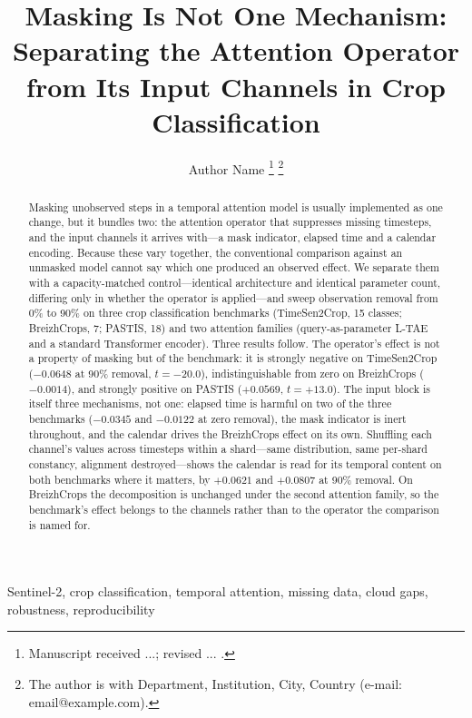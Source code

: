 \documentclass[journal]{IEEEtran}
\begin{document}
\title{Masking Is Not One Mechanism: Separating the Attention Operator from
Its Input Channels in Crop Classification}

\author{Author Name%
\thanks{Manuscript received ...; revised ... .}%
\thanks{The author is with Department, Institution, City, Country (e-mail:
email@example.com).}}

\maketitle

\begin{abstract}
Masking unobserved steps in a temporal attention model is usually implemented as
one change, but it bundles two: the attention operator that suppresses missing
timesteps, and the input channels it arrives with---a mask indicator, elapsed
time and a calendar encoding. Because these vary together, the conventional
comparison against an unmasked model cannot say which one produced an observed
effect. We separate them with a capacity-matched control---identical
architecture and identical parameter count, differing only in whether the
operator is applied---and sweep observation removal from 0\% to 90\% on three
crop classification benchmarks (TimeSen2Crop, 15 classes; BreizhCrops, 7;
PASTIS, 18) and two attention families (query-as-parameter L-TAE and a standard
Transformer encoder). Three results follow. The operator's effect is not a
property of masking but of the benchmark: it is strongly negative on
TimeSen2Crop ($-0.0648$ at 90\% removal, $t=-20.0$), indistinguishable from zero
on BreizhCrops ($-0.0014$), and strongly positive on PASTIS ($+0.0569$,
$t=+13.0$). The input block is itself three mechanisms, not one: elapsed time is
harmful on two of the three benchmarks ($-0.0345$ and $-0.0122$ at zero
removal), the mask indicator is inert throughout, and the calendar drives the
BreizhCrops effect on its own. Shuffling each channel's values across timesteps
within a shard---same distribution, same per-shard constancy, alignment
destroyed---shows the calendar is read for its temporal content on both
benchmarks where it matters, by $+0.0621$ and $+0.0807$ at 90\% removal. On
BreizhCrops the decomposition is unchanged under the second attention family,
so the benchmark's effect belongs to the channels rather than to the operator
the comparison is named for.
\end{abstract}

\begin{IEEEkeywords}
Sentinel-2, crop classification, temporal attention, missing data, cloud gaps,
robustness, reproducibility
\end{IEEEkeywords}
\end{document}
